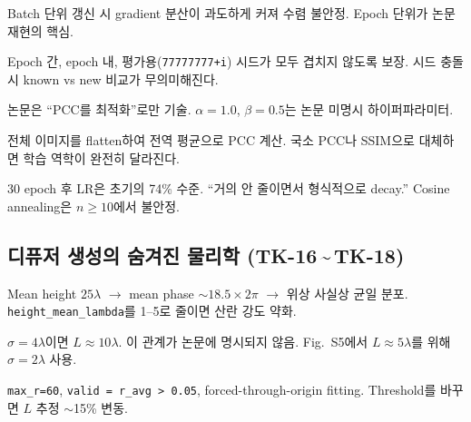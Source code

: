 \documentclass[11pt, a4paper]{article}
\begin{document}
\begin{tkbox}
Batch 단위 갱신 시 gradient 분산이 과도하게 커져 수렴 불안정. Epoch 단위가 논문 재현의 핵심.
\end{tkbox}

\begin{tkbox}
Epoch 간, epoch 내, 평가용(\texttt{77777777+i}) 시드가 모두 겹치지 않도록 보장. 시드 충돌 시 known vs new 비교가 무의미해진다.
\end{tkbox}

\begin{tkbox}[TK-13. Loss = $-$PCC $+$ energy\_penalty]
논문은 ``PCC를 최적화''로만 기술. $\alpha = 1.0$, $\beta = 0.5$는 논문 미명시 하이퍼파라미터.
\end{tkbox}

\begin{tkbox}[TK-14. 전역 PCC 계산]
전체 이미지를 flatten하여 전역 평균으로 PCC 계산. 국소 PCC나 SSIM으로 대체하면 학습 역학이 완전히 달라진다.
\end{tkbox}

\begin{tkbox}[TK-15. LR schedule $\gamma = 0.99$]
30 epoch 후 LR은 초기의 74\% 수준. ``거의 안 줄이면서 형식적으로 decay.'' Cosine annealing은 $n \geq 10$에서 불안정.
\end{tkbox}

\subsection{디퓨저 생성의 숨겨진 물리학 (TK-16\,\textasciitilde\,TK-18)}

\begin{tkbox}
Mean height $25\lambda$ $\to$ mean phase $\sim 18.5 \times 2\pi$ $\to$ 위상 사실상 균일 분포. \texttt{height\_mean\_lambda}를 1--5로 줄이면 산란 강도 약화.
\end{tkbox}

\begin{tkbox}
$\sigma = 4\lambda$이면 $L \approx 10\lambda$. 이 관계가 논문에 명시되지 않음. Fig.~S5에서 $L \approx 5\lambda$를 위해 $\sigma = 2\lambda$ 사용.
\end{tkbox}

\begin{tkbox}
\texttt{max\_r=60}, \texttt{valid = r\_avg > 0.05}, forced-through-origin fitting. Threshold를 바꾸면 $L$ 추정 $\sim$15\% 변동.
\end{tkbox}
\end{document}
